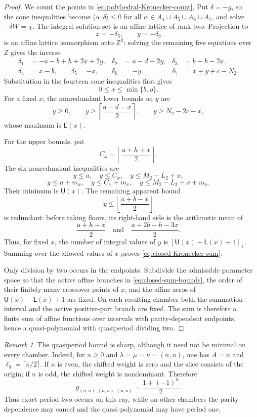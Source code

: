\documentclass[11pt,reqno]{amsart}
\numberwithin{equation}{section}
\theoremstyle{remark}
\newtheorem{remark}[remark]{Remark}
\newcommand{\ZZ}{\mathbb{Z}}
\newcommand{\pos}[1]{\left[#1\right]_{+}}
\begin{document}
\begin{proof}
We count the points in \eqref{eq:polyhedral-Kronecker-count}.  Put
$\delta=-g$, so the cone inequalities become
$\langle\alpha,\delta\rangle\le0$ for all
$\alpha\in A_4\cup A_5\cup A_6\cup A_7$, and solve
$-\delta W=\bar\chi$.  The integral solution set is an affine lattice of rank two.  Projection
to
\[ x=-\delta_5, \qquad y=-\delta_6 \]
is an affine lattice isomorphism onto $\ZZ^2$: solving the remaining five
equations over $\ZZ$ gives the inverse
\begin{equation*}
 \begin{aligned}
 \delta_1&=-a-b+h+2x+2y,&
 \delta_2&=a-d-2y,&
 \delta_3&=b-h-2x,\\
 \delta_4&=x-b,\qquad
 \delta_5=-x,&
 \delta_6&=-y,&\delta_7&=x+y+c-N_2.
 \end{aligned}
\end{equation*}
Substitution in the fourteen cone inequalities first gives
\[ 0\le x\le\min\{b,\rho\}. \]
For a fixed $x$, the nonredundant lower bounds on $y$ are
\[ y\ge0, \qquad y\ge\left\lceil\frac{a-d-x}{2}\right\rceil, \qquad y\ge N_2-2c-x, \]
whose maximum is $\mathsf L(x)$.

For the upper bounds, put
\[ C_x=\left\lfloor\frac{a+h+x}{2}\right\rfloor. \]
The six nonredundant inequalities are
\[ y\le a,\quad y\le C_x,\quad y\le M_2-L_2+x, \]
\[ y\le a+m_x,\quad y\le C_x+m_x, \quad y\le M_2-L_2+x+m_x. \]
Their minimum is $\mathsf U(x)$.  The remaining apparent bound
\[ y\le\left\lfloor\frac{a+b-x}{2}\right\rfloor \]
is redundant: before taking floors, its right-hand side is the arithmetic
mean of
\[ \frac{a+h+x}{2} \quad\text{and}\quad \frac{a+2b-h-3x}{2}. \]
Thus, for fixed $x$, the number of integral values of $y$ is
$\pos{\mathsf U(x)-\mathsf L(x)+1}$.  Summing over the allowed values of
$x$ proves \eqref{eq:closed-Kronecker-sum}.

Only division by two occurs in the endpoints.  Subdivide the admissible
parameter space so that the active affine branches in
\eqref{eq:closed-sum-bounds}, the order of their finitely many crossover
points of $x$, and the affine zeros of
$\mathsf U(x)-\mathsf L(x)+1$ are fixed.  On each resulting chamber both
the summation interval and the active positive-part branch are fixed.  The
sum is therefore a finite sum of affine functions over intervals with
parity-dependent endpoints, hence a quasi-polynomial with quasiperiod
dividing two.
\end{proof}

\begin{remark}
The quasiperiod bound is sharp, although it need not be minimal on every
chamber.  Indeed, for $n\ge0$ and $\lambda=\mu=\nu=(n,n)$, one has $A=n$ and
$\ell_0=\lceil n/2\rceil$.  If $n$ is even, the shifted weight is zero
and the slice consists of the origin; if $n$ is odd, the shifted weight is
nondominant.  Therefore
\[ g_{(n,n),(n,n),(n,n)}=\frac{1+(-1)^n}{2}. \]
Thus exact period two occurs on this ray, while on other chambers the parity
dependence may cancel and the quasi-polynomial may have period one.
\end{remark}
\end{document}
